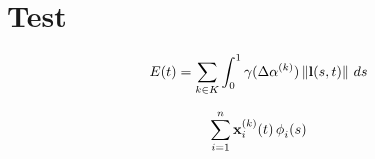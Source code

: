 \chapter{Test}
\label{chap:chap1}

\begin{equation}
    E(t) = \sum_{k \in K} \int_0^1 \gamma(\Delta \alpha^{(k)})\left\lVert\mathbf{l}(s,t)\right\rVert\, ds
    \label{eq:energy}
\end{equation}

\begin{equation}
    \boundary
    \label{eq:boundarydiscret}
\end{equation}